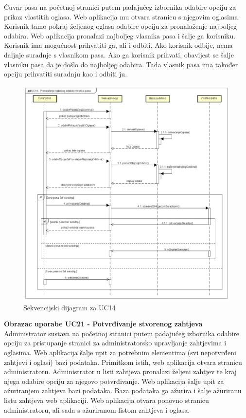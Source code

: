 				Čuvar pasa na početnoj stranici putem padajućeg izbornika odabire opciju za prikaz vlastitih oglasa. Web aplikacija mu otvara stranicu s njegovim oglasima. Korisnik tamo pokraj željenog oglasa odabire opciju za pronalaženje najboljeg odabira. Web aplikacija pronalazi najboljeg vlasnika pasa i šalje ga korisniku. Korisnik ima mogućnost prihvatiti ga, ali i odbiti. Ako korisnik odbije, nema daljnje suradnje s vlasnikom pasa. Ako ga korisnik prihvati, obavijest se šalje vlasniku pasa da je došlo do najboljeg odabira. Tada vlasnik pasa ima također opciju prihvatiti suradnju kao i odbiti ju.
				
				\begin{figure}[htb]
					\centering
					\includegraphics[width=14cm]{slike/Sekvencijski dijagram - UC14}
					\caption{Sekvencijski dijagram za UC14}
					\label{fig:Sekvencijski-UC14}
				\end{figure}
				\eject		
				
				\textbf{Obrazac uporabe UC21 - Potvrđivanje stvorenog zahtjeva}\\
				
				Administrator sustava na početnoj stranici putem padajućeg izbornika odabire opciju za pristupanje stranici za administratorsko upravljanje zahtjevima i oglasima. Web aplikacija šalje upit za potrebnim elementima (svi nepotvrđeni zahtjevi i oglasi) bazi podataka. Primitkom istih, web aplikacija otvara stranicu administratoru. Administrator u listi zahtjeva pronalazi željeni zahtjev te kraj njega odabire opciju za njegovo potvrđivanje. Web aplikacija šalje upit za ažuriranjem zahtjeva bazi podataka. Baza podataka ga ažurira i šalje ažuriranu listu zahtjeva web aplikaciji. Web aplikacija otvara ponovno stranicu administratoru, ali sada s ažuriranom listom zahtjeva i oglasa.
				
